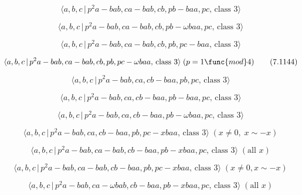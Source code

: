 \documentclass[10pt]{article}
\begin{document}
\begin{equation}
\langle a,b,c\,|\,p^2a-bab,ca-bab,cb,pb-baa,pc,\,\text{class }3\rangle 
\tag{7.1141}
\end{equation}

\begin{equation}
\langle a,b,c\,|\,p^{2}a-bab,ca-bab,cb,pb-\omega baa,pc,\,\text{class }%
3\rangle  \tag{7.1142}
\end{equation}

\begin{equation}
\langle a,b,c\,|\,p^2a-bab,ca-bab,cb,pb,pc-baa,\,\text{class }3\rangle 
\tag{7.1143}
\end{equation}

\begin{equation}
\langle a,b,c\,|\,p^{2}a-bab,ca-bab,cb,pb,pc-\omega baa,\,\text{class }%
3\rangle \;(p=1\func{mod}4)  \tag{7.1144}
\end{equation}

\begin{equation}
\langle a,b,c\,|\,p^2a-bab,ca,cb-baa,pb,pc,\,\text{class }3\rangle 
\tag{7.1145}
\end{equation}

\begin{equation}
\langle a,b,c\,|\,p^2a-bab,ca,cb-baa,pb-baa,pc,\,\text{class }3\rangle 
\tag{7.1146}
\end{equation}

\begin{equation}
\langle a,b,c\,|\,p^{2}a-bab,ca,cb-baa,pb-\omega baa,pc,\,\text{class }%
3\rangle  \tag{7.1147}
\end{equation}

\begin{equation}
\langle a,b,c\,|\,p^{2}a-bab,ca,cb-baa,pb,pc-xbaa,\,\text{class }3\rangle
\;(x\neq 0,\;x\sim -x)  \tag{7.1148}
\end{equation}

\begin{equation}
\langle a,b,c\,|\,p^2a-bab,ca-bab,cb-baa,pb-xbaa,pc,\,\text{class }3\rangle
\;(\text{all }x)  \tag{7.1149}
\end{equation}

\begin{equation}
\langle a,b,c\,|\,p^2a-bab,ca-bab,cb-baa,pb,pc-xbaa,\,\text{class }3\rangle
\;(x \neq 0, x \sim -x)  \tag{7.1150}
\end{equation}

\begin{equation}
\langle a,b,c\,|\,p^{2}a-bab,ca-\omega bab,cb-baa,pb-xbaa,pc,\,\text{class }%
3\rangle \;(\text{all }x)  \tag{7.1151}
\end{equation}
\end{document}

